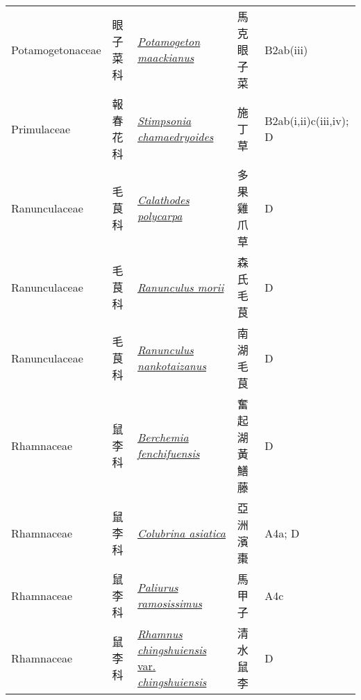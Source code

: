 {\begin{longtable}{L{2.5cm}L{2cm}L{5cm}L{2.5cm}L{3cm}}
    Potamogetonaceae & 眼子菜科 & \href{http://www.theplantlist.org/tpl1.1/search?q=Potamogeton+maackianus}{\textit{Potamogeton maackianus} } & 馬克眼子菜 & B2ab(iii)    \\
    Primulaceae & 報春花科 & \href{http://www.theplantlist.org/tpl1.1/search?q=Stimpsonia+chamaedryoides}{\textit{Stimpsonia chamaedryoides} } & 施丁草 & B2ab(i,ii)c(iii,iv); D    \\
    Ranunculaceae & 毛茛科 & \href{http://www.theplantlist.org/tpl1.1/search?q=Calathodes+polycarpa}{\textit{Calathodes polycarpa} } & 多果雞爪草 & D    \\
    Ranunculaceae & 毛茛科 & \href{http://www.theplantlist.org/tpl1.1/search?q=Ranunculus+morii}{\textit{Ranunculus morii} } & 森氏毛茛 & D    \\
    Ranunculaceae & 毛茛科 & \href{http://www.theplantlist.org/tpl1.1/search?q=Ranunculus+nankotaizanus}{\textit{Ranunculus nankotaizanus} } & 南湖毛茛 & D    \\
    Rhamnaceae & 鼠李科 & \href{http://www.theplantlist.org/tpl1.1/search?q=Berchemia+fenchifuensis}{\textit{Berchemia fenchifuensis} } & 奮起湖黃鱔藤 & D    \\
    Rhamnaceae & 鼠李科 & \href{http://www.theplantlist.org/tpl1.1/search?q=Colubrina+asiatica}{\textit{Colubrina asiatica} } & 亞洲濱棗 & A4a; D    \\
    Rhamnaceae & 鼠李科 & \href{http://www.theplantlist.org/tpl1.1/search?q=Paliurus+ramosissimus}{\textit{Paliurus ramosissimus} } & 馬甲子 & A4c    \\
    Rhamnaceae & 鼠李科 & \href{http://www.theplantlist.org/tpl1.1/search?q=Rhamnus+chingshuiensis+var.+chingshuiensis}{\textit{Rhamnus chingshuiensis} var. \textit{chingshuiensis} } & 清水鼠李 & D    \\

\end{longtable}}
